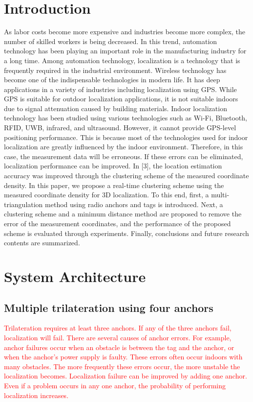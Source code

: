 \documentclass[conference]{IEEEtran}
\begin{document}
\section{Introduction}
As labor costs become more expensive and industries become more complex, the number of skilled workers is being decreased. In this trend, automation technology has been playing an important role in the manufacturing industry for a long time\cite{b1}. Among automation technology, localization is a technology that is frequently required in the industrial environment. Wireless technology has become one of the indispensable technologies in modern life. It has deep applications in a variety of industries including localization using GPS\cite{b2}. While GPS is suitable for outdoor localization applications, it is not suitable indoors due to signal attenuation caused by building materials. Indoor localization technology has been studied using various technologies such as Wi-Fi, Bluetooth, RFID, UWB, infrared, and ultrasound\cite{b3}. However, it cannot provide GPS-level positioning performance. This is because most of the technologies used for indoor localization are greatly influenced by the indoor environment. Therefore, in this case, the measurement data will be erroneous. If these errors can be eliminated, localization performance can be improved. In [3], the location estimation accuracy was improved through the clustering scheme of the measured coordinate density\cite{b4}. In this paper, we propose a real-time clustering scheme using the measured coordinate density for 3D localization. To this end, first, a multi-triangulation method using radio anchors and tags is introduced\cite{b5}. Next, a clustering scheme and a minimum distance method are proposed to remove the error of the measurement coordinates, and the performance of the proposed scheme is evaluated through experiments\cite{b6}. Finally, conclusions and future research contents are summarized\cite{b7}.

\section{System Architecture}

\subsection{Multiple trilateration using four anchors}
\textcolor{red}{Trilateration requires at least three anchors. If any of the three anchors fail, localization will fail. There are several causes of anchor errors. For example, anchor failures occur when an obstacle is between the tag and the anchor, or when the anchor's power supply is faulty. These errors often occur indoors with many obstacles. The more frequently these errors occur, the more unstable the localization becomes.
Localization failure can be improved by adding one anchor.
Even if a problem occurs in any one anchor, the probability of performing localization increases.}
\end{document}
